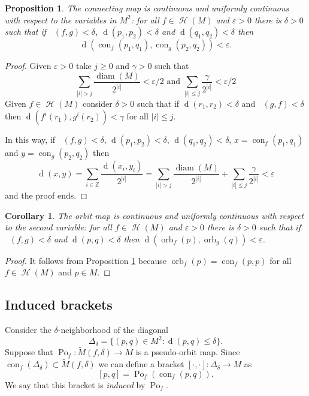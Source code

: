 \documentclass[12pt]{amsart}
\DeclareMathOperator{\ho}{\mathcal{H}}
\DeclareMathOperator{\homeo}{\ho}
\theoremstyle{plain}
\newtheorem{cor}[thm]{Corollary}
\newtheorem{prop}[thm]{Proposition}
\theoremstyle{definition}
\theoremstyle{remark}
\DeclareMathOperator{\diam}{diam}
\DeclareMathOperator{\dist}{d}
\DeclareMathOperator{\distcc}{\dist_{C^0}}
\DeclareMathOperator{\orb}{orb}
\DeclareMathOperator{\con}{con}
\DeclareMathOperator{\pom}{Po}
\newcommand{\Z}{\mathbb Z}
\renewcommand{\epsilon}{\varepsilon}
\newcommand{\tM}{\tilde{M}}
\begin{document}
\begin{prop}
	\label{propConCont}
	The connecting map  is continuous and uniformly continuous with respect to the variables in $M^2$:
	for all $f\in\homeo(M)$ and $\epsilon>0$ there is $\delta>0$ such that
	if $\distcc(f,g)<\delta$, $\dist(p_1,p_2)<\delta$ and $\dist(q_1,q_2)<\delta$
	then
	$$\dist(\con_f(p_1,q_1),\con_g(p_2,q_2))<\epsilon.$$
\end{prop}

\begin{proof}
	Given $\epsilon>0$ take $j\geq 0$ and $\gamma>0$ such that
	\[
	\sum_{|i|>j} \frac{\diam(M)}{2^{|i|}}<\epsilon/2
	\text{ and }
	\sum_{|i|\leq j} \frac{\gamma}{2^{|i|}}<\epsilon/2
	\]
	Given $f\in\homeo(M)$ consider $\delta>0$ such that
	if $\dist(r_1,r_2)<\delta$ and $\distcc(g,f)<\delta$
	then $\dist(f^i(r_1),g^i(r_2))<\gamma$ for all
	$|i|\leq j$.

	In this way, if $\distcc(f,g)<\delta$,
	$\dist(p_1,p_2)<\delta$, $\dist(q_1,q_2)<\delta$,
	$x=\con_f(p_1,q_1)$ and $y=\con_g(p_2,q_2)$
	then
	\[
	\dist(x,y)=\sum_{i\in\Z} \frac{\dist(x_i,y_i)}{2^{|i|}}
	=\sum_{|i|>j} \frac{\diam(M)}{2^{|i|}}
	+
	\sum_{|i|\leq j} \frac{\gamma}{2^{|i|}}<\epsilon
	\]
	and the proof ends.
\end{proof}

\begin{cor}
	\label{coroContOrb}
	The orbit map is continuous and uniformly continuous with respect to the second variable:
	for all $f\in\homeo(M)$ and $\epsilon>0$ there is $\delta>0$ such that
	if $\distcc(f,g)<\delta$ and $\dist(p,q)<\delta$ then
	$\dist(\orb_f(p),\orb_g(q))<\epsilon$.
\end{cor}

\begin{proof}
	It follows from Proposition \ref{propConCont} because $\orb_f(p)=\con_f(p,p)$ for all $f\in\homeo(M)$ and $p\in M$.
\end{proof}


\subsection{Induced brackets}
\label{secIndBracket}
Consider the $\delta$-neighborhood of the diagonal
$$\Delta_\delta=\{(p,q)\in M^2:\dist(p,q)\leq\delta\}.$$
Suppose that $\pom_f\colon \tM(f,\delta)\to M$ is a pseudo-orbit map.
Since $\con_f(\Delta_\delta)\subset \tM(f,\delta)$ we can define a bracket
$[\cdot,\cdot]\colon \Delta_\delta\to M$ as
$$[p,q]=\pom_f(\con_f(p,q)).$$
We say that this bracket is \textit{induced} by $\pom_f$.
\end{document}
